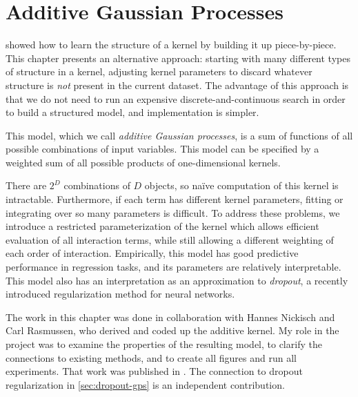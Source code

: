 
\inbpdocument



\chapter{Additive Gaussian Processes}
\label{ch:additive}





 showed how to learn the structure of a kernel by building it up piece-by-piece.
This chapter presents an alternative approach: starting with many different types of structure in a kernel, adjusting kernel parameters to discard whatever structure is \emph{not} present in the current dataset.
The advantage of this approach is that we do not need to run an expensive discrete-and-continuous search in order to build a structured model, and implementation is simpler.

This model, which we call \emph{additive Gaussian processes}, is a sum of functions of all possible combinations of input variables.
This model can be specified by a weighted sum of all possible products of one-dimensional kernels.

There are $2^D$ combinations of $D$ objects, so na\"{i}ve computation of this kernel is intractable.
Furthermore, if each term has different kernel parameters, fitting or integrating over so many parameters is difficult.
To address these problems, we introduce a restricted parameterization of the kernel which allows efficient evaluation of all interaction terms, while still allowing a different weighting of each order of interaction.
Empirically, this model has good predictive performance in regression tasks, and its parameters are relatively interpretable.
This model also has an interpretation as an approximation to \emph{dropout}, a recently introduced regularization method for neural networks.

The work in this chapter was done in collaboration with Hannes Nickisch and Carl Rasmussen, who derived and coded up the additive kernel.
My role in the project was to examine the properties of the resulting model, to clarify the connections to existing methods, and to create all figures and run all experiments.
That work was published in \citet{duvenaud2011additive11}.
The connection to dropout regularization in \cref{sec:dropout-gps} is an independent contribution.






